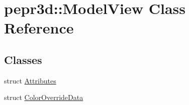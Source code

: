 \hypertarget{classpepr3d_1_1_model_view}{}\section{pepr3d\+::Model\+View Class Reference}
\label{classpepr3d_1_1_model_view}
\subsection*{Classes}
\begin{DoxyCompactItemize}
\item 
struct \mbox{\hyperlink{structpepr3d_1_1_model_view_1_1_attributes}{Attributes}}
\item 
struct \mbox{\hyperlink{structpepr3d_1_1_model_view_1_1_color_override_data}{Color\+Override\+Data}}
\end{DoxyCompactItemize}
